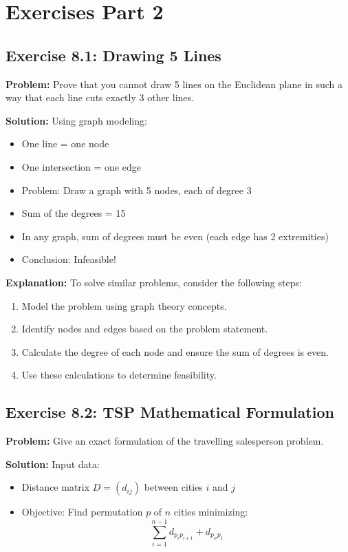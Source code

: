 \section{Exercises Part 2}
\subsection{Exercise 8.1: Drawing 5 Lines}
\textbf{Problem:} Prove that you cannot draw 5 lines on the Euclidean plane in such a way that each line cuts exactly 3 other lines.

\textbf{Solution:}
Using graph modeling:
\begin{itemize}
\item One line = one node
\item One intersection = one edge
\item Problem: Draw a graph with 5 nodes, each of degree 3
\item Sum of the degrees = 15
\item In any graph, sum of degrees must be even (each edge has 2 extremities)
\item Conclusion: Infeasible!
\end{itemize}

\textbf{Explanation:}
To solve similar problems, consider the following steps:
\begin{enumerate}
\item Model the problem using graph theory concepts.
\item Identify nodes and edges based on the problem statement.
\item Calculate the degree of each node and ensure the sum of degrees is even.
\item Use these calculations to determine feasibility.
\end{enumerate}

\subsection{Exercise 8.2: TSP Mathematical Formulation}
\textbf{Problem:} Give an exact formulation of the travelling salesperson problem.

\textbf{Solution:}
Input data:
\begin{itemize}
\item Distance matrix $D = (d_{ij})$ between cities $i$ and $j$
\item Objective: Find permutation $p$ of $n$ cities minimizing:
\[ \sum_{i=1}^{n-1} d_{p_ip_{i+1}} + d_{p_np_1} \]
\end{itemize}

